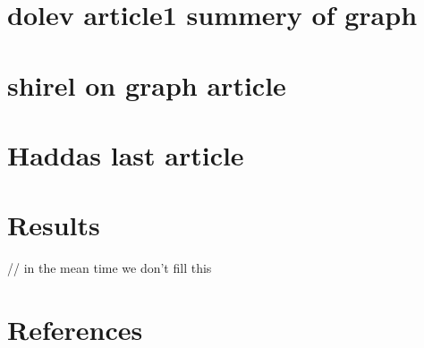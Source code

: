 \documentclass[12pt]{article}
\begin{document}


\section{dolev article1 summery of graph}



\section{shirel on graph article}



\section{Haddas last article}



\section{Results}
// in the mean time we don't fill this

\section{References}

\printbibliography
\end{document}
